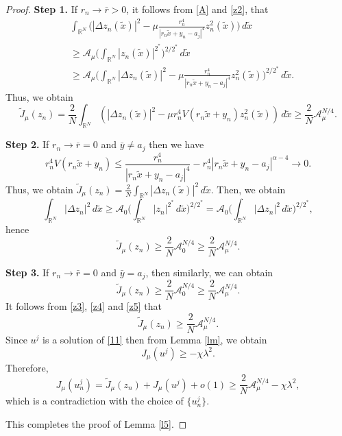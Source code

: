 \documentclass[reqno]{amsart}
\begin{document}
\begin{proof}
\noindent\textbf{Step 1.} If \(r_n\to \bar{r}>0\),
it follows from \eqref{A} and \eqref{z2}, that
 \begin{align*}
&\int_{\mathbb{R}^N}\Big( |\Delta z_n(\tilde{x})|^2-\mu \frac{r_n^4}
{\left| r_{n}\tilde{x}+y_n-a_j\right| ^4}z_n^2(\tilde{x})\Big)\,d\tilde{x}\\
 &\geq \mathcal{A}_{\mu} \Big( \int _{\mathbb{R}^N}|z_n(\tilde{x})|^{2^*}\Big) ^{2/2^*}\,d\tilde{x}\\
 &\geq \mathcal{A}_{\mu} \Big(\int_{\mathbb{R}^N} |\Delta z_n(\tilde{x})|^2
 -\mu \frac{r_n^4}{\left| r_{n}\tilde{x}+y_n-a_j\right| ^4}z_n^2(\tilde{x})
 \Big)^{2/2^*} \,d\tilde{x}.
 \end{align*}
Thus, we obtain
\begin{equation}\label{z3}
 \tilde{J}_\mu(z_n)=\frac{2}{N}\int_{\mathbb{R}^N}
 \left( |\Delta z_n(\tilde{x})|^2-\mu r_n^4 V(r_n\tilde{x}+y_n)z_n^2(\tilde{x})
 \right)\,d\tilde{x}\geq \frac{2}{N} \mathcal{A}_{\mu}^{N/4}.
 \end{equation}
 
\noindent\textbf{Step 2.} If \(r_n\to \bar{r}=0\) and \(\bar {y}\neq a_j\) then we have
 \[
 r_n^4V(r_n\tilde{x}+y_n)\leq \frac{r_n^4}{\left|r_n\tilde{x}+y_n-a_j\right| ^4 }
 -r_n^4\left|r_n\tilde{x}+y_n-a_j\right|^{\alpha-4}\to 0.
 \]
Thus, we obtain
 \(\tilde{J}_\mu(z_n)=\frac{2}{N}\int_{\mathbb{R}^N} 
 |\Delta z_n(\tilde{x})|^2\,d\tilde{x}\). Then, we obtain
\[
 \int_{\mathbb{R}^N}|\Delta {z}_n|^2\,d\tilde{x}
 \geq \mathcal{A}_{0}\Big( \int _{\mathbb{R}^N}|{z}_n|^{2^*}\,d\tilde{x}\Big) ^{2/2^*}
 =\mathcal{A}_{0}\Big( \int_{\mathbb{R}^N}|\Delta {z}_n|^2\,d\tilde{x}\Big) ^{2/2^*},
\]
hence
 \begin{equation}\label{z4}
 \tilde{J}_\mu(z_n)\geq \frac{2}{N} \mathcal{A}_{0}^{N/4}\geq \frac{2}{N} \mathcal{A}_{\mu}^{N/4}.
 \end{equation}
 
\noindent\textbf{Step 3.}
 If \(r_n\to \bar{r}=0\) and \(\bar {y}=a_j\), then similarly, we can obtain
 \begin{equation}\label{z5}
 \tilde{J}_\mu(z_n)\geq \frac{2}{N} \mathcal{A}_{0}^{N/4}
 \geq \frac{2}{N} \mathcal{A}_{\mu}^{N/4}.
 \end{equation}
It follows from \eqref{z3}, \eqref{z4} and \eqref{z5} that
\[
 \tilde{J}_\mu(z_n)\geq \frac{2}{N} \mathcal{A}_{\mu}^{N/4}.
\]
Since $u^j$ is a solution of \eqref{11} then from Lemma \ref{lm}, we obtain
 \[
 J_{\mu}(u^j)\geq -\chi \lambda^2.
 \]
 Therefore, 
 \[
 J_\mu(u^j_n)=\tilde{J}_\mu(z_n)+J_{\mu}(u^j)+o(1)
 \geq \frac{2}{N} \mathcal{A}_{\mu}^{N/4} -\chi \lambda^2,
 \]
which is a contradiction with the choice of \(\{u_n^j\}\).

This completes the proof of Lemma \ref{l5}.
\end{proof}
\end{document}
